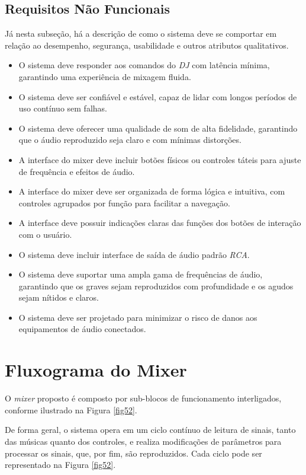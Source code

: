 \subsection{Requisitos Não Funcionais}
Já nesta subseção, há a descrição de como o sistema deve se comportar em relação ao desempenho, segurança, usabilidade e outros atributos qualitativos.  
\begin{itemize}
    \item O sistema deve responder aos comandos do \textit{DJ} com latência mínima, garantindo uma experiência de mixagem fluida.
    \item O sistema deve ser confiável e estável, capaz de lidar com longos períodos de uso contínuo sem falhas.
    \item O sistema deve oferecer uma qualidade de som de alta fidelidade, garantindo que o áudio reproduzido seja claro e com mínimas distorções.
    \item A interface do mixer deve incluir botões físicos ou controles táteis para ajuste de frequência e efeitos de áudio.
    \item A interface do mixer deve ser organizada de forma lógica e intuitiva, com controles agrupados por função para facilitar a navegação.
    \item A interface deve possuir indicações claras das funções dos botões de interação com o usuário.
    \item O sistema deve incluir interface de saída de áudio padrão \textit{RCA}.
    \item O sistema deve suportar uma ampla gama de frequências de áudio, garantindo que os graves sejam reproduzidos com profundidade e os agudos sejam nítidos e claros.
    \item O sistema deve ser projetado para minimizar o risco de danos aos equipamentos de áudio conectados.
\end{itemize}



\section{Fluxograma do Mixer}

O \textit{mixer} proposto é composto por sub-blocos de funcionamento interligados, conforme ilustrado na Figura \ref{fig52}.

De forma geral, o sistema opera em um ciclo contínuo de leitura de sinais, tanto das músicas quanto dos controles, e realiza modificações de parâmetros para processar os sinais, que, por fim, são reproduzidos. Cada ciclo pode ser representado na Figura \ref{fig52}.

